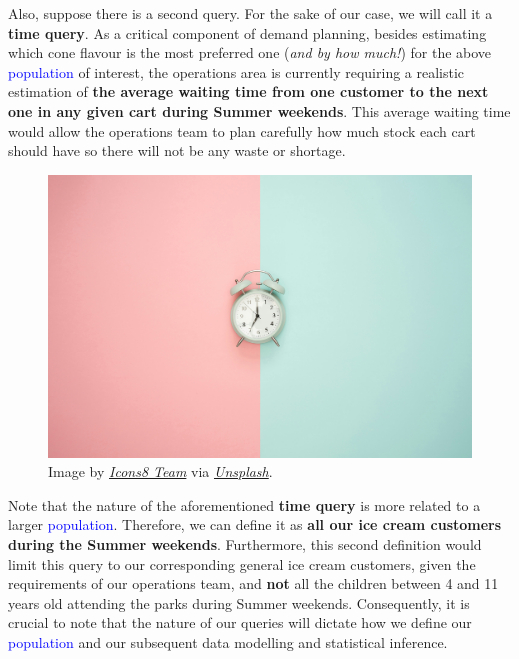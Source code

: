 \documentclass[
  letterpaper,
  DIV=11,
  numbers=noendperiod]{scrreprt}
\begin{document}
Also, suppose there is a second query. For the sake of our case, we will
call it a \textbf{time query}. As a critical component of demand
planning, besides estimating which cone flavour is the most preferred
one (\emph{and by how much!}) for the above \textcolor{blue}{population}
of interest, the operations area is currently requiring a realistic
estimation of \textbf{the average waiting time from one customer to the
next one in any given cart during Summer weekends}. This average waiting
time would allow the operations team to plan carefully how much stock
each cart should have so there will not be any waste or shortage.

\begin{figure}[H]

{\centering \includegraphics[width=5.20833in,height=\textheight]{book/img/clock.jpg}

}

\caption{Image by
\href{https://unsplash.com/@icons8?utm_content=creditCopyText&utm_medium=referral&utm_source=unsplash}{\emph{Icons8
Team}} via
\href{https://unsplash.com/photos/silver-bell-alarm-clock-dhZtNlvNE8M}{\emph{Unsplash}}.}

\end{figure}%

Note that the nature of the aforementioned \textbf{time query} is more
related to a larger \textcolor{blue}{population}. Therefore, we can
define it as \textbf{all our ice cream customers during the Summer
weekends}. Furthermore, this second definition would limit this query to
our corresponding general ice cream customers, given the requirements of
our operations team, and \textbf{not} all the children between 4 and 11
years old attending the parks during Summer weekends. Consequently, it
is crucial to note that the nature of our queries will dictate how we
define our \textcolor{blue}{population} and our subsequent data
modelling and statistical inference.
\end{document}
